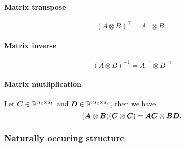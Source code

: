 \paragraph{Matrix transpose}
$$ (A \otimes B)^{\top} = A^{\top} \otimes B^{\top} $$

\paragraph{Matrix inverse}
$$ (A \otimes B)^{-1} = A^{-1} \otimes B^{-1} $$

\paragraph{Matrix mutliplication}
Let ${\bm{C}} \in \mathbb{R}^{n_2 \times d_1}$ and ${\bm{D}} \in \mathbb{R}^{m_2 \times d_2}$, then we have
$$ ({\bm{A}} \otimes {\bm{B}})({\bm{C}} \otimes {\bm{C}}) = {\bm{A}} {\bm{C}} \otimes {\bm{B}} {\bm{D}}. $$ 

\subsubsection{Naturally occuring structure}

